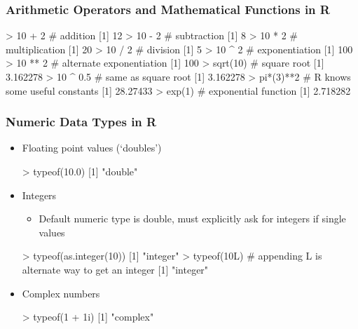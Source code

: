 \documentclass{beamer}
\begin{document}
\begin{frame}[fragile]
  \frametitle{Arithmetic Operators and Mathematical Functions in R}


\begin{Rcode}
> 10 + 2 # addition
[1] 12
> 10 - 2 # subtraction
[1] 8
> 10 * 2 # multiplication
[1] 20
> 10 / 2 # division
[1] 5
> 10 ^ 2 # exponentiation
[1] 100
> 10 ** 2 # alternate exponentiation
[1] 100
> sqrt(10) # square root
[1] 3.162278
> 10 ^ 0.5 # same as square root
[1] 3.162278
> pi*(3)**2  # R knows some useful constants
[1] 28.27433
> exp(1) # exponential function
[1] 2.718282
\end{Rcode}

\end{frame}


\begin{frame}[fragile]
  \frametitle{Numeric Data Types in R}
\begin{itemize}

\item Floating point values (`doubles')
\begin{Rcode}
> typeof(10.0)
[1] "double"
\end{Rcode}


\item Integers
\begin{itemize}
  \item Default numeric type is double, must explicitly ask for integers if single values
\end{itemize}
\begin{Rcode}
> typeof(as.integer(10))
[1] "integer"
> typeof(10L) # appending L is alternate way to get an integer
[1] "integer"
\end{Rcode}

\item Complex numbers
\begin{Rcode}
> typeof(1 + 1i)
[1] "complex"
\end{Rcode}

\end{itemize}

\end{frame}
\end{document}
